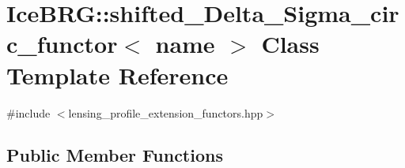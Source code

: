 \hypertarget{classIceBRG_1_1shifted__Delta__Sigma__circ__functor}{\section{Ice\-B\-R\-G\-:\-:shifted\-\_\-\-Delta\-\_\-\-Sigma\-\_\-circ\-\_\-functor$<$ name $>$ Class Template Reference}
\label{classIceBRG_1_1shifted__Delta__Sigma__circ__functor}
}


{\ttfamily \#include $<$lensing\-\_\-profile\-\_\-extension\-\_\-functors.\-hpp$>$}

\subsection*{Public Member Functions}
